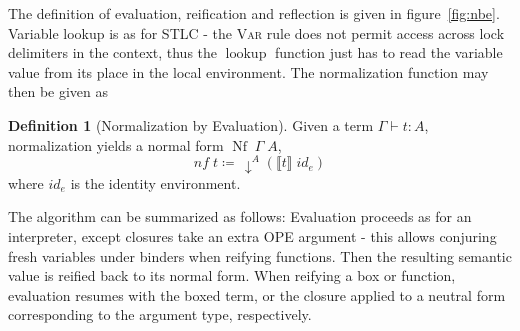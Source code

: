 \documentclass[12pt,twoside,openright]{report}
\numberwithin{equation}{chapter}
\numberwithin{figure}{chapter}
\numberwithin{table}{chapter}
\theoremstyle{definition}\newtheorem{definition}{Definition}
\begin{document}
The definition of evaluation, reification and reflection is given in figure~\ref{fig:nbe}.
Variable lookup is as for STLC -
the \textsc{Var} rule does not permit access across lock delimiters in the context,
thus the $\operatorname{lookup}$ function just has to read
the variable value from its place in the local environment.
The normalization function may then be given as
\begin{definition}[Normalization by Evaluation]
  Given a term $\Gamma \vdash t : A$,
  normalization yields a normal form $\operatorname{Nf} \; \Gamma \; A$,
  $$ \textit{nf} \; t \coloneqq \, \downarrow^A (\llbracket t \rrbracket \; \textit{id}_e) $$
  where $\textit{id}_e$ is the identity environment.
\end{definition}
The algorithm can be summarized as follows:
Evaluation proceeds as for an interpreter,
except closures take an extra OPE argument -
this allows conjuring fresh variables under binders
when reifying functions.
Then the resulting semantic value is reified back to its normal form.
When reifying a box or function,
evaluation resumes with the boxed term,
or the closure applied to a neutral form corresponding to the argument type,
respectively.
\end{document}
